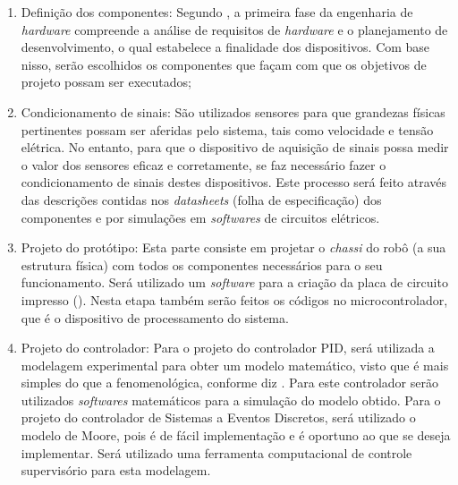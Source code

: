 \begin{enumerate}

 \item Definição dos componentes: %
Segundo , a primeira fase da engenharia de \textit{hardware} 
compreende a análise de requisitos de \textit{hardware} e o planejamento de desenvolvimento, o qual estabelece a finalidade dos 
dispositivos. Com base nisso, serão escolhidos os componentes que façam com que os objetivos de projeto possam ser executados;

 \item Condicionamento de sinais: São utilizados sensores para que grandezas físicas pertinentes possam ser aferidas pelo sistema, 
 tais como velocidade e tensão elétrica. No entanto, para que o dispositivo de aquisição de sinais possa medir 
 o valor dos sensores eficaz e corretamente, se faz necessário fazer o condicionamento de sinais destes dispositivos. Este 
 processo será feito através das descrições contidas nos \textit{datasheets} (folha de especificação) dos componentes e por 
 simulações em \textit{softwares} de circuitos elétricos.
 
 
 \item Projeto do protótipo: Esta parte consiste em projetar o \textit{chassi} do robô (a sua estrutura física) com todos os componentes 
 necessários para o seu funcionamento. Será utilizado um \textit{software} 
  para a criação da placa de circuito impresso 
 (). Nesta etapa também serão feitos os códigos no microcontrolador, que é o dispositivo 
 de processamento do sistema.
 
 \item Projeto do controlador: Para o projeto do controlador PID, será utilizada a modelagem experimental 
 para obter um modelo matemático, visto que é mais simples do que a fenomenológica, conforme diz . Para este 
 controlador serão utilizados \textit{softwares} matemáticos para a simulação do modelo obtido. Para o projeto do controlador 
 de Sistemas a Eventos Discretos, será utilizado o modelo de Moore, pois é de fácil implementação e é oportuno ao que se deseja 
 implementar. Será utilizado uma ferramenta	 computacional de controle supervisório para esta modelagem.
 

\end{enumerate}
